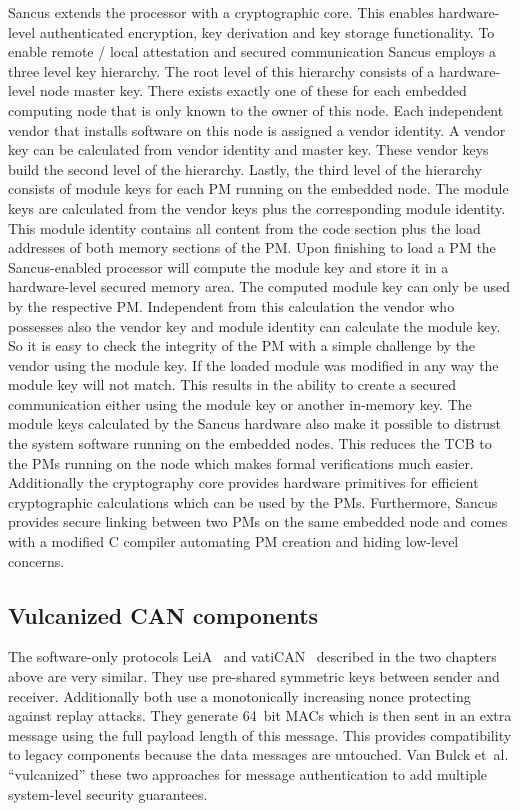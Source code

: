 Sancus extends the processor with a cryptographic core. This enables
hardware-level authenticated encryption, key derivation and key storage
functionality. To enable remote / local attestation and secured communication
Sancus employs a three level key hierarchy. The root level of this hierarchy
consists of a hardware-level node master key. There exists exactly one of these
for each embedded computing node that is only known to the owner of this node.
Each independent vendor that installs software on this node is assigned a vendor
identity. A vendor key can be calculated from vendor identity and master key.
These vendor keys build the second level of the hierarchy. Lastly, the third
level of the hierarchy consists of module keys for each PM running on the
embedded node. The module keys are calculated from the vendor keys plus the
corresponding module identity. This module identity contains all content from
the code section plus the load addresses of both memory sections of the PM\@.
Upon finishing to load a PM the Sancus-enabled processor will compute the module
key and store it in a hardware-level secured memory area. The computed module
key can only be used by the respective PM\@. Independent from this calculation
the vendor who possesses also the vendor key and module identity can calculate
the module key. So it is easy to check the integrity of the PM with a simple
challenge by the vendor using the module key. If the loaded module was modified
in any way the module key will not match. This results in the ability to create
a secured communication either using the module key or another in-memory key.
The module keys calculated by the Sancus hardware also make it possible to
distrust the system software running on the embedded nodes. This reduces the TCB
to the PMs running on the node which makes formal verifications much easier.
Additionally the cryptography core provides hardware primitives for efficient
cryptographic calculations which can be used by the PMs. Furthermore, Sancus
provides secure linking between two PMs on the same embedded node and comes with
a modified C compiler automating PM creation and hiding low-level concerns.

\subsection{Vulcanized CAN components}

The software-only protocols LeiA~\cite{Radu2016} and
vatiCAN~\cite{Nurnberger2016} described in the two chapters above are very
similar. They use pre-shared symmetric keys between sender and receiver.
Additionally both use a monotonically increasing nonce protecting against replay
attacks. They generate 64~bit MACs which is then sent in an extra message using
the full payload length of this message. This provides compatibility to legacy
components because the data messages are untouched. Van Bulck et~al.
``vulcanized'' these two approaches for message authentication to add multiple
system-level security guarantees. 


